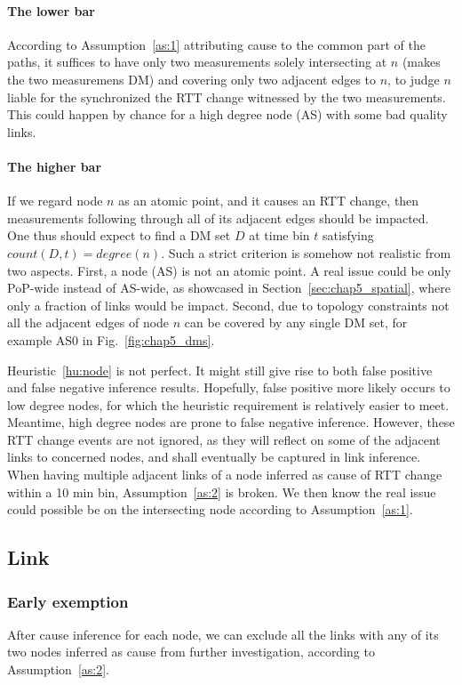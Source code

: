 \paragraph{The lower bar} According to Assumption~\ref{as:1} attributing cause to the common part of the paths, it suffices to have only two measurements solely intersecting at $n$ (makes the two measuremens \ac{DM}) and covering only two adjacent edges to $n$, to judge $n$ liable for the synchronized the RTT change witnessed by the two measurements. This could happen by chance for a high degree node (AS) with some bad quality links.

\paragraph{The higher bar} If we regard node $n$ as an atomic point, and it causes an RTT change, then measurements following through all of its adjacent edges should be impacted. One thus should expect to find a \ac{DM} set $D$ at time bin $t$ satisfying $count(D, t) = degree(n)$. Such a strict criterion is somehow not realistic from two aspects. First, a node (AS) is not an atomic point. A real issue could be only PoP-wide instead of AS-wide, as showcased in Section~\ref{sec:chap5_spatial}, where only a fraction of links would be impact. Second, due to topology constraints not all the adjacent edges of node $n$ can be covered by any single \ac{DM} set, for example AS0 in Fig.~\ref{fig:chap5_dms}.

Heuristic~\ref{hu:node} is not perfect. It might still give rise to both false positive and false negative inference results. Hopefully, false positive more likely occurs to low degree nodes, for which the heuristic requirement is relatively easier to meet. Meantime, high degree nodes are prone to false negative inference. However, these RTT change events are not ignored, as they will reflect on some of the adjacent links to concerned nodes, and shall eventually be captured in link inference. When having multiple adjacent links of a node inferred as cause of RTT change within a 10 min bin, Assumption~\ref{as:2} is broken. We then know the real issue could possible be on the intersecting node according to Assumption~\ref{as:1}.

\subsection{Link}

\subsubsection{Early exemption}
After cause inference for each node, we can exclude all the links with any of its two nodes inferred as cause from further investigation, according to Assumption~\ref{as:2}.

